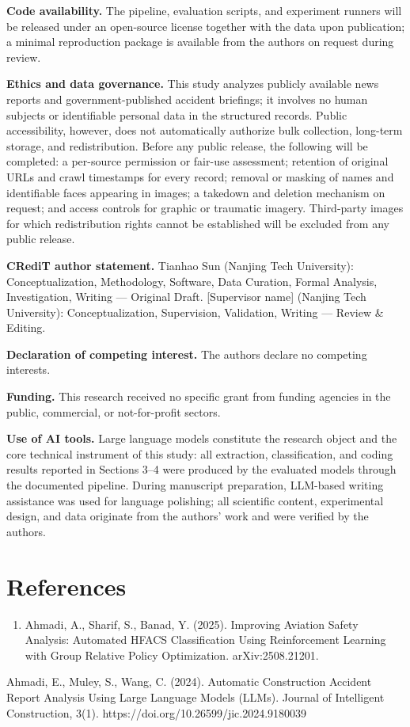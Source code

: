 \documentclass[11pt]{article}
\begin{document}
\textbf{Code availability.} The pipeline, evaluation scripts, and experiment runners will be released under an open-source license together with the data upon publication; a minimal reproduction package is available from the authors on request during review.

\textbf{Ethics and data governance.} This study analyzes publicly available news reports and government-published accident briefings; it involves no human subjects or identifiable personal data in the structured records. Public accessibility, however, does not automatically authorize bulk collection, long-term storage, and redistribution. Before any public release, the following will be completed: a per-source permission or fair-use assessment; retention of original URLs and crawl timestamps for every record; removal or masking of names and identifiable faces appearing in images; a takedown and deletion mechanism on request; and access controls for graphic or traumatic imagery. Third-party images for which redistribution rights cannot be established will be excluded from any public release.

\textbf{CRediT author statement.} Tianhao Sun (Nanjing Tech University): Conceptualization, Methodology, Software, Data Curation, Formal Analysis, Investigation, Writing --- Original Draft. [Supervisor name] (Nanjing Tech University): Conceptualization, Supervision, Validation, Writing --- Review \& Editing.

\textbf{Declaration of competing interest.} The authors declare no competing interests.

\textbf{Funding.} This research received no specific grant from funding agencies in the public, commercial, or not-for-profit sectors.

\textbf{Use of AI tools.} Large language models constitute the research object and the core technical instrument of this study: all extraction, classification, and coding results reported in Sections 3--4 were produced by the evaluated models through the documented pipeline. During manuscript preparation, LLM-based writing assistance was used for language polishing; all scientific content, experimental design, and data originate from the authors' work and were verified by the authors.

\section*{References}
\begin{enumerate}
\item Ahmadi, A., Sharif, S., Banad, Y. (2025). Improving Aviation Safety Analysis: Automated HFACS Classification Using Reinforcement Learning with Group Relative Policy Optimization. arXiv:2508.21201.
\end{enumerate}
Ahmadi, E., Muley, S., Wang, C. (2024). Automatic Construction Accident Report Analysis Using Large Language Models (LLMs). Journal of Intelligent Construction, 3(1). https:/\allowbreak{}/\allowbreak{}doi.\allowbreak{}org/\allowbreak{}10.\allowbreak{}26599/\allowbreak{}jic.\allowbreak{}2024.\allowbreak{}9180039
\end{document}
